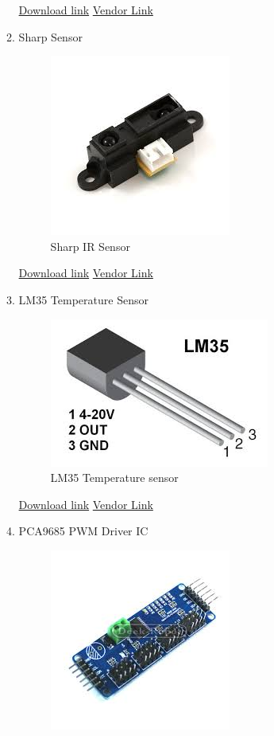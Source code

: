 \documentclass[a4paper,12pt,oneside]{book}
\begin{document}
\begin{itemize}
\begin{enumerate}
\begin{figure}[H]
      \end{figure}
      \href{https://cdn-shop.adafruit.com/datasheets/MCP3008.pdf} {Download link}
      \href{http://www.dnatechindia.com/MCP3008-10-Bit-ADC.html} {Vendor Link}
      \item Sharp Sensor      \\
      \begin{figure}[H]
        \centering
        \includegraphics[scale=0.6]{sharp}
        \caption{Sharp IR Sensor}
      \end{figure}
      \href{http://www.sharpsma.com/webfm_send/1208} {Download link}
      \href{http: //www.ebay.in/itm/262401450416?aff_source=Sok-Goog} {Vendor Link}
      \item LM35 Temperature Sensor    \\
      \begin{figure}[H]
        \centering
        \includegraphics[scale=0.6]{lm35}
        \caption{LM35 Temperature sensor}
      \end{figure}
      \href{http://www.ti.com/lit/ds/symlink/lm35.pdf} {Download link}
      \href{http://www.amazon.in/Robo-India-Temperature-Sensor-LM35/dp/B00WO5AFPE} {Vendor Link}
      \item PCA9685 PWM Driver IC  \\
      \begin{figure}[H]
        \centering
        \includegraphics[scale=0.6]{PCA9685}

\end{figure}
\end{enumerate}
\end{itemize}
\end{document}
